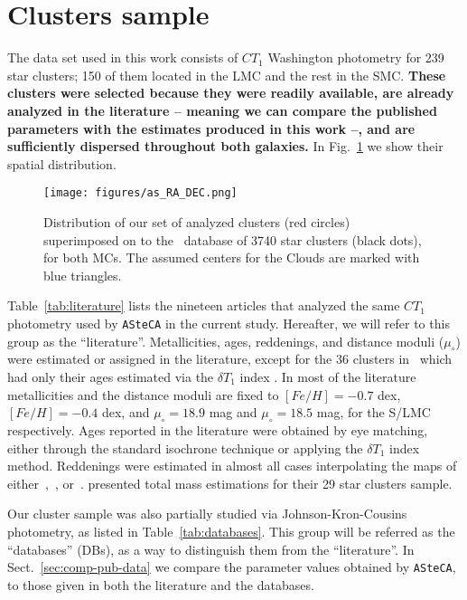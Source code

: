 \documentclass[referee]{aa}
\begin{document}

\section{Clusters sample}
\label{sec:clust-sample}

The data set used in this work consists of $CT_1$ Washington photometry for 239
star clusters; 150 of them located in the LMC and the rest in the SMC.\@
%
\textbf{These clusters were selected because they were readily available, are
already analyzed in the literature -- meaning we can compare the published
parameters with the estimates produced in this work --, and are sufficiently
dispersed throughout both galaxies.}
%
In Fig.~\ref{fig:ra-dec} we show their spatial distribution.

\begin{figure}
\centering
\texttt{[image: figures/as\_RA\_DEC.png]}
\caption{Distribution of our set of analyzed clusters (red circles)
superimposed on to the~\cite{Bica_2008} database of 3740 star clusters (black
dots), for both MCs. The assumed centers for the Clouds are marked with blue
triangles.}
\label{fig:ra-dec}
\end{figure}

Table~\ref{tab:literature} lists the nineteen articles that analyzed the same
$CT_1$ photometry used by \texttt{ASteCA} in the current study. Hereafter, we
will refer to this group as the ``literature''.
%
Metallicities, ages, reddenings, and distance moduli ($\mu_{\circ}$)
were estimated or assigned in the literature, except for the 36
clusters in~\cite{Piatti_2011b} which had only their ages estimated
via the $\delta T_1$ index \citep{Phelps_1994,Geisler_1997}.
%
In most of the literature metallicities and the distance moduli are fixed to
$[Fe/H]{=}-0.7$ dex, $[Fe/H]{=}-0.4$ dex, and $\mu_{\circ}{=}18.9$ mag and
$\mu_{\circ}{=}18.5$ mag, for the S/LMC respectively.
Ages reported in the literature were obtained by eye matching, either through
the standard isochrone technique or applying the $\delta T_1$ index method.
Reddenings were estimated in almost all cases interpolating the maps
of either~\cite{Burstein_1982},~\cite{Schlegel_1998}, or~\cite{Haschke_2011}.
%
\cite{Maia_2013} presented total mass estimations for their 29 star clusters
sample.

Our cluster sample was also partially studied via Johnson-Kron-Cousins
photometry, as listed in Table~\ref{tab:databases}. This group will be referred
as the ``databases'' (DBs), as a way to distinguish them from the
``literature''. In Sect.~\ref{sec:comp-pub-data} we compare the parameter
values obtained by \texttt{ASteCA}, to those given in both the literature and
the databases.
\end{document}
